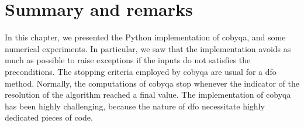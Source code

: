 




\section{Summary and remarks}

In this chapter, we presented the Python implementation of \gls{cobyqa}, and some numerical experiments.
In particular, we saw that the implementation avoids as much as possible to raise exceptions if the inputs do not satisfies the preconditions.
The stopping criteria employed by \gls{cobyqa} are usual for a \gls{dfo} method.
Normally, the computations of \gls{cobyqa} stop whenever the indicator of the resolution of the algorithm reached a final value.
The implementation of \gls{cobyqa} has been highly challenging, because the nature of \gls{dfo} necessitate highly dedicated pieces of code.

